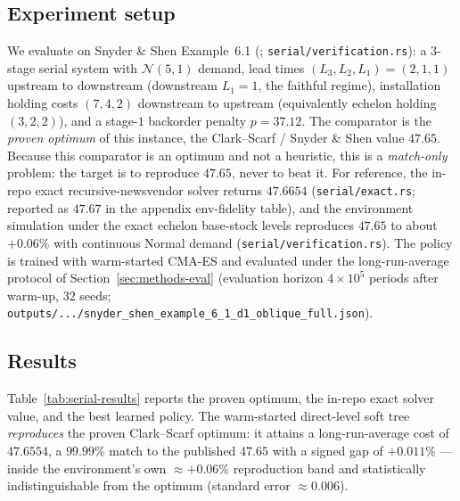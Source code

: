 \subsection{Experiment setup}

We evaluate on Snyder \& Shen Example~6.1 (\citealp{snyder2019foundations};
\texttt{serial/verification.rs}): a $3$-stage serial system with $\mathcal N(5,1)$ demand, lead times
$(L_3,L_2,L_1)=(2,1,1)$ upstream to downstream (downstream $L_1=1$, the faithful regime), installation
holding costs $(7,4,2)$ downstream to upstream (equivalently echelon holding $(3,2,2)$), and a
stage-$1$ backorder penalty $p=37.12$. The comparator is the \emph{proven optimum} of this instance,
the Clark--Scarf / Snyder \& Shen value $47.65$. Because this comparator is an optimum and not a
heuristic, this is a \emph{match-only} problem: the target is to reproduce $47.65$, never to beat it.
For reference, the in-repo exact recursive-newsvendor solver returns $47.6654$
(\texttt{serial/exact.rs}; reported as $47.67$ in the appendix env-fidelity table), and the
environment simulation under the exact echelon base-stock levels reproduces $47.65$ to about $+0.06\%$
with continuous Normal demand (\texttt{serial/verification.rs}). The policy is trained with
warm-started CMA-ES and evaluated under the long-run-average protocol of
Section~\ref{sec:methods-eval} (evaluation horizon $4\times10^5$ periods after warm-up, $32$ seeds;
\texttt{outputs/.../snyder\_shen\_example\_6\_1\_d1\_oblique\_full.json}).

\subsection{Results}

Table~\ref{tab:serial-results} reports the proven optimum, the in-repo exact solver value, and the
best learned policy. The warm-started direct-level soft tree \emph{reproduces} the proven Clark--Scarf
optimum: it attains a long-run-average cost of $47.6554$, a $99.99\%$ match to the published $47.65$
with a signed gap of $+0.011\%$ --- inside the environment's own $\approx{+}0.06\%$ reproduction band
and statistically indistinguishable from the optimum (standard error $\approx0.006$).

